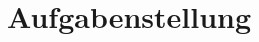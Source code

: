 \documentclass[12pt]{article}
\begin{document}
	\begin{titlepage}
		
	\end{titlepage}
	
	\tableofcontents
	\newpage
	
	\section{Aufgabenstellung}
	
\end{document}
